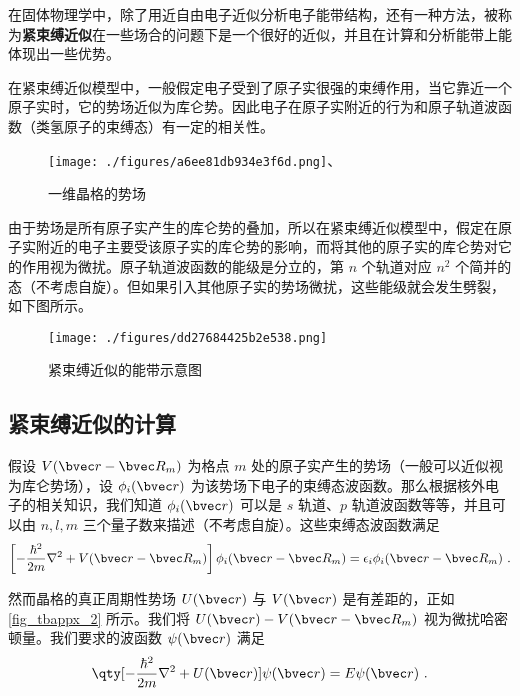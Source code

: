 

在固体物理学中，除了用近自由电子近似分析电子能带结构，还有一种方法，被称为\textbf{紧束缚近似}在一些场合的问题下是一个很好的近似，并且在计算和分析能带上能体现出一些优势。

在紧束缚近似模型中，一般假定电子受到了原子实很强的束缚作用，当它靠近一个原子实时，它的势场近似为库仑势。因此电子在原子实附近的行为和原子轨道波函数（类氢原子的束缚态）有一定的相关性。
\begin{figure}[ht]
\centering
\texttt{[image: ./figures/a6ee81db934e3f6d.png]}、
\caption{一维晶格的势场} \label{fig_tbappx_2}
\end{figure}


由于势场是所有原子实产生的库仑势的叠加，所以在紧束缚近似模型中，假定在原子实附近的电子主要受该原子实的库仑势的影响，而将其他的原子实的库仑势对它的作用视为微扰。原子轨道波函数的能级是分立的，第 $n$ 个轨道对应 $n^2$ 个简并的态（不考虑自旋）。但如果引入其他原子实的势场微扰，这些能级就会发生劈裂，如下图所示。

\begin{figure}[ht]
\centering
\texttt{[image: ./figures/dd27684425b2e538.png]}
\caption{紧束缚近似的能带示意图} \label{fig_tbappx_1}
\end{figure}

\subsection{紧束缚近似的计算}

假设 $V(\bvec r-\bvec R_m)$ 为格点 $m$ 处的原子实产生的势场（一般可以近似视为库仑势场），设 $\phi_i(\bvec r)$ 为该势场下电子的束缚态波函数。那么根据核外电子的相关知识，我们知道 $\phi_i(\bvec r)$ 可以是 $s$ 轨道、$p$ 轨道波函数等等，并且可以由 $n,l,m$ 三个量子数来描述（不考虑自旋）。这些束缚态波函数满足
\begin{equation}
\left[-\frac{\hbar^2}{2m}\nabla^2+V(\bvec r-\bvec R_m)\right]\phi_i(\bvec r-\bvec R_m)=\epsilon_i\phi_i(\bvec r-\bvec R_m)~.
\end{equation}

然而晶格的真正周期性势场 $U(\bvec r)$ 与 $V(\bvec r)$ 是有差距的，正如 \autoref{fig_tbappx_2} 所示。我们将 $U(\bvec r)-V(\bvec r-\bvec R_m)$ 视为微扰哈密顿量。我们要求的波函数 $\psi(\bvec r)$ 满足
\begin{equation}\label{eq_tbappx_1}
\qty[-\frac{\hbar^2}{2m}\nabla^2+U(\bvec r)]\psi(\bvec r)=E\psi(\bvec r)~.
\end{equation}

